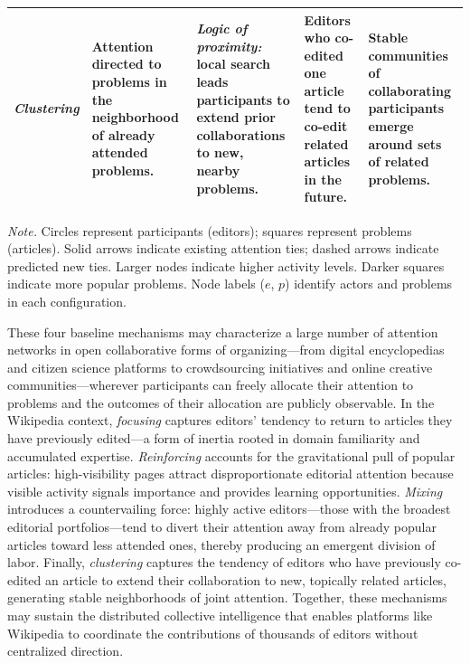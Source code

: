 \documentclass[11pt]{article}
\begin{document}
{\begin{landscape}
\begin{table}[p]
\begin{threeparttable}
\begin{tabular}{p{2.8cm} H{4cm} H{5cm} H{4cm} H{4.5cm}}
{\begin{tikzpicture}[scale=0.75, every node/.style={inner sep=1.5pt}]
\end{tikzpicture}\\[2pt]
\small\textit{Clustering}}
& Attention directed to problems in the neighborhood of already attended problems.
& \emph{Logic of proximity:} local search leads participants to extend prior collaborations to new, nearby problems.
& Editors who co-edited one article tend to co-edit related articles in the future.
& Stable communities of collaborating participants emerge around sets of related problems. \\
\bottomrule
\end{tabular}
\begin{tablenotes}[flushleft]
\small\singlespacing
\item \textit{Note.} Circles represent participants (editors); squares represent problems (articles). Solid arrows indicate existing attention ties; dashed arrows indicate predicted new ties. Larger nodes indicate higher activity levels. Darker squares indicate more popular problems. Node labels ($e$, $p$) identify actors and problems in each configuration.
\end{tablenotes}
\end{threeparttable}
\end{table}
\end{landscape}
}%

These four baseline mechanisms may characterize a large number of attention networks in open collaborative forms of organizing---from digital encyclopedias and citizen science platforms to crowdsourcing initiatives and online creative communities---wherever participants can freely allocate their attention to problems and the outcomes of their allocation are publicly observable. In the Wikipedia context, \emph{focusing} captures editors' tendency to return to articles they have previously edited---a form of inertia rooted in domain familiarity and accumulated expertise. \emph{Reinforcing} accounts for the gravitational pull of popular articles: high-visibility pages attract disproportionate editorial attention because visible activity signals importance and provides learning opportunities. \emph{Mixing} introduces a countervailing force: highly active editors---those with the broadest editorial portfolios---tend to divert their attention away from already popular articles toward less attended ones, thereby producing an emergent division of labor. Finally, \emph{clustering} captures the tendency of editors who have previously co-edited an article to extend their collaboration to new, topically related articles, generating stable neighborhoods of joint attention. Together, these mechanisms may sustain the distributed collective intelligence that enables platforms like Wikipedia to coordinate the contributions of thousands of editors without centralized direction.
\end{document}
